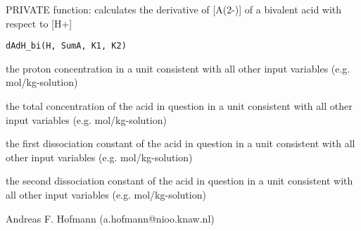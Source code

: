 \documentclass{article}
\begin{document}
\begin{Description}\relax
PRIVATE function: calculates the derivative of [A(2-)] of a bivalent acid with respect to [H+]
\end{Description}
\begin{Usage}
\begin{verbatim}dAdH_bi(H, SumA, K1, K2)\end{verbatim}
\end{Usage}
\begin{Arguments}
\begin{ldescription}
\item[\code{H }] the proton concentration in a unit consistent with all other input variables (e.g. mol/kg-solution)
\item[\code{SumA }] the total concentration of the acid in question in a unit consistent with all other input variables (e.g. mol/kg-solution)
\item[\code{K1 }] the first dissociation constant of the acid in question in a unit consistent with all other input variables (e.g. mol/kg-solution)
\item[\code{K2 }] the second dissociation constant of the acid in question in a unit consistent with all other input variables (e.g. mol/kg-solution)
\end{ldescription}
\end{Arguments}
\begin{Author}\relax
Andreas F. Hofmann (a.hofmann@nioo.knaw.nl)
\end{Author}
\end{document}
